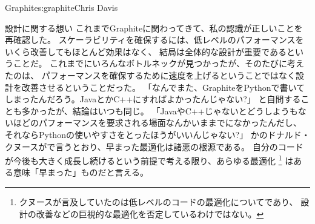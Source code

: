 \begin{aosachapter}{Graphite}{s:graphite}{Chris Davis}
\begin{aosasect1}{設計に関する想い}
これまでGraphiteに関わってきて、私の認識が正しいことを再確認した。
スケーラビリティを確保するには、低レベルのパフォーマンスをいくら改善してもほとんど効果はなく、
結局は全体的な設計が重要であるということだ。
これまでにいろんなボトルネックが見つかったが、そのたびに考えたのは、
パフォーマンスを確保するために速度を上げるということではなく設計を改善させるということだった。
「なんでまた、GraphiteをPythonで書いてしまったんだろう。JavaとかC++にすればよかったんじゃない?」
と自問することも多かったが、結論はいつも同じ。
「JavaやC++じゃないとどうしようもないほどのパフォーマンスを要求される場面なんかいままでになかったんだし、
それならPythonの使いやすさをとったほうがいいんじゃない?」
かのドナルド・クヌースが\cite{bib:knuth:goto}で言うとおり、早まった最適化は諸悪の根源である。
自分のコードが今後も大きく成長し続けるという前提で考える限り、あらゆる最適化
\footnote{クヌースが言及していたのは低レベルのコードの最適化についてであり、
設計の改善などの巨視的な最適化を否定しているわけではない。}
はある意味「早まった」ものだと言える。


\end{aosasect1}
\end{aosachapter}
